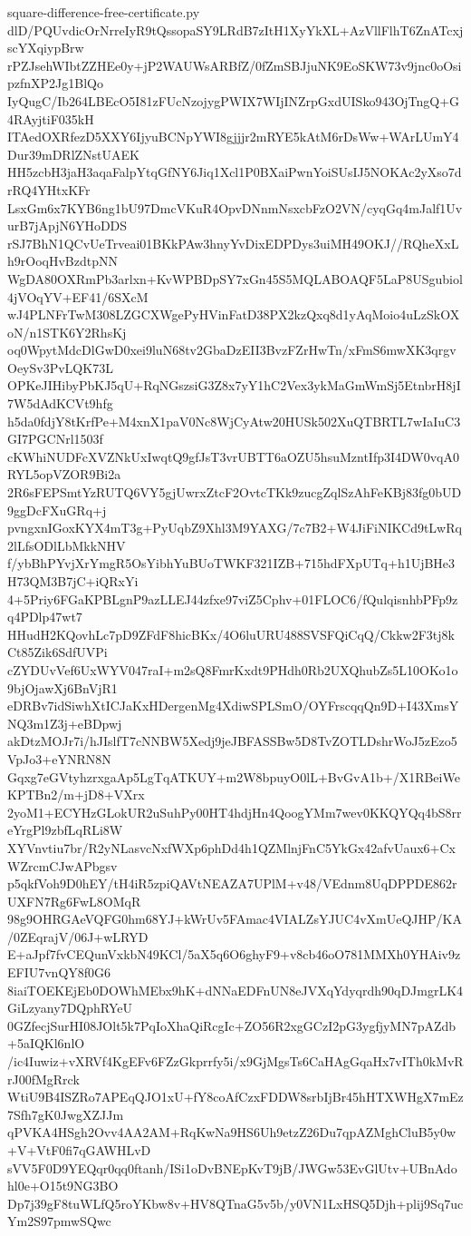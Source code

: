 \documentclass[11pt]{article}
\theoremstyle{definition}
\theoremstyle{remark}
\begin{document}
\begin{filecontents*}[overwrite]{square-difference-free-certificate.py}
dlD/PQUvdicOrNrreIyR9tQssopaSY9LRdB7zItH1XyYkXL+AzVllFlhT6ZnATcxjscYXqiypBrw
rPZJsehWIbtZZHEe0y+jP2WAUWsARBfZ/0fZmSBJjuNK9EoSKW73v9jnc0oOsipzfnXP2Jg1BlQo
IyQugC/Ib264LBEcO5I81zFUcNzojygPWIX7WIjINZrpGxdUISko943OjTngQ+G4RAyjtiF035kH
ITAedOXRfezD5XXY6IjyuBCNpYWI8gjjjr2mRYE5kAtM6rDsWw+WArLUmY4Dur39mDRlZNstUAEK
HH5zcbH3jaH3aqaFalpYtqGfNY6Jiq1Xcl1P0BXaiPwnYoiSUsIJ5NOKAc2yXso7drRQ4YHtxKFr
LsxGm6x7KYB6ng1bU97DmcVKuR4OpvDNnmNsxcbFzO2VN/cyqGq4mJalf1UvurB7jApjN6YHoDDS
rSJ7BhN1QCvUeTrveai01BKkPAw3hnyYvDixEDPDys3uiMH49OKJ//RQheXxLh9rOoqHvBzdtpNN
WgDA80OXRmPb3arlxn+KvWPBDpSY7xGn45S5MQLABOAQF5LaP8USgubiol4jVOqYV+EF41/6SXcM
wJ4PLNFrTwM308LZGCXWgePyHVinFatD38PX2kzQxq8d1yAqMoio4uLzSkOXoN/n1STK6Y2RhsKj
oq0WpytMdcDlGwD0xei9luN68tv2GbaDzEII3BvzFZrHwTn/xFmS6mwXK3qrgvOeySv3PvLQK73L
OPKeJIHibyPbKJ5qU+RqNGszsiG3Z8x7yY1hC2Vex3ykMaGmWmSj5EtnbrH8jI7W5dAdKCVt9hfg
h5da0fdjY8tKrfPe+M4xnX1paV0Nc8WjCyAtw20HUSk502XuQTBRTL7wIaIuC3GI7PGCNrl1503f
cKWhiNUDFcXVZNkUxIwqtQ9gfJsT3vrUBTT6aOZU5hsuMzntIfp3I4DW0vqA0RYL5opVZOR9Bi2a
2R6sFEPSmtYzRUTQ6VY5gjUwrxZtcF2OvtcTKk9zucgZqlSzAhFeKBj83fg0bUD9ggDcFXuGRq+j
pvngxnIGoxKYX4mT3g+PyUqbZ9Xhl3M9YAXG/7c7B2+W4JiFiNIKCd9tLwRq2lLfsODlLbMkkNHV
f/ybBhPYvjXrYmgR5OsYibhYuBUoTWKF321IZB+715hdFXpUTq+h1UjBHe3H73QM3B7jC+iQRxYi
4+5Priy6FGaKPBLgnP9azLLEJ44zfxe97viZ5Cphv+01FLOC6/fQulqisnhbPFp9zq4PDlp47wt7
HHudH2KQovhLc7pD9ZFdF8hicBKx/4O6luURU488SVSFQiCqQ/Ckkw2F3tj8kCt85Zik6SdfUVPi
cZYDUvVef6UxWYV047raI+m2sQ8FmrKxdt9PHdh0Rb2UXQhubZs5L10OKo1o9bjOjawXj6BnVjR1
eDRBv7idSiwhXtICJaKxHDergenMg4XdiwSPLSmO/OYFrscqqQn9D+I43XmsYNQ3m1Z3j+eBDpwj
akDtzMOJr7i/hJIslfT7cNNBW5Xedj9jeJBFASSBw5D8TvZOTLDshrWoJ5zEzo5VpJo3+eYNRN8N
Gqxg7eGVtyhzrxgaAp5LgTqATKUY+m2W8bpuyO0lL+BvGvA1b+/X1RBeiWeKPTBn2/m+jD8+VXrx
2yoM1+ECYHzGLokUR2uSuhPy00HT4hdjHn4QoogYMm7wev0KKQYQq4bS8rreYrgPl9zbfLqRLi8W
XYVnvtiu7br/R2yNLasvcNxfWXp6phDd4h1QZMlnjFnC5YkGx42afvUaux6+CxWZrcmCJwAPbgsv
p5qkfVoh9D0hEY/tH4iR5zpiQAVtNEAZA7UPlM+v48/VEdnm8UqDPPDE862rUXFN7Rg6FwL8OMqR
98g9OHRGAeVQFG0hm68YJ+kWrUv5FAmac4VIALZsYJUC4vXmUeQJHP/KA/0ZEqrajV/06J+wLRYD
E+aJpf7fvCEQunVxkbN49KCl/5aX5q6O6ghyF9+v8cb46oO781MMXh0YHAiv9zEFIU7vnQY8f0G6
8iaiTOEKEjEb0DOWhMEbx9hK+dNNaEDFnUN8eJVXqYdyqrdh90qDJmgrLK4GiLzyany7DQphRYeU
0GZfecjSurHI08JOlt5k7PqIoXhaQiRcgIc+ZO56R2xgGCzI2pG3ygfjyMN7pAZdb+5aIQKl6nlO
/ic4Iuwiz+vXRVf4KgEFv6FZzGkprrfy5i/x9GjMgsTs6CaHAgGqaHx7vITh0kMvRrJ00fMgRrck
WtiU9B4ISZRo7APEqQJO1xU+fY8coAfCzxFDDW8srbIjBr45hHTXWHgX7mEz7Sfh7gK0JwgXZJJm
qPVKA4HSgh2Ovv4AA2AM+RqKwNa9HS6Uh9etzZ26Du7qpAZMghCluB5y0w+V+VtF0fi7qGAWHLvD
sVV5F0D9YEQqr0qq0ftanh/ISi1oDvBNEpKvT9jB/JWGw53EvGlUtv+UBnAdohl0e+O15t9NG3BO
Dp7j39gF8tuWLfQ5roYKbw8v+HV8QTnaG5v5b/y0VN1LxHSQ5Djh+plij9Sq7ucYm2S97pmwSQwc

\end{filecontents*}
\end{document}
